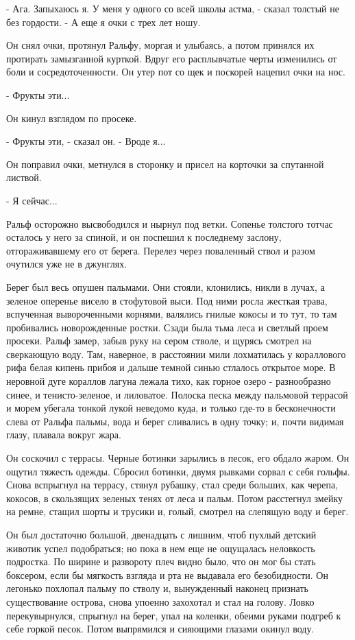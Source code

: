 \documentclass[12pt]{article}
\begin{document}
    - Ага. Запыхаюсь я. У меня у одного  со  всей  школы  астма,  -  сказал
толстый не без гордости. - А еще я очки с трех лет ношу.

    Он  снял  очки, протянул Ральфу, моргая и улыбаясь, а потом принялся их
протирать замызганной курткой. Вдруг его расплывчатые  черты  изменились  от
боли и сосредоточенности. Он утер пот со щек и поскорей нацепил очки на нос.

    - Фрукты эти...

    Он кинул взглядом по просеке.

    - Фрукты эти, - сказал он. - Вроде я...

    Он поправил очки, метнулся в сторонку и присел на корточки за спутанной
листвой.

    - Я сейчас...

    Ральф  осторожно  высвободился  и  нырнул  под  ветки. Сопенье толстого
тотчас осталось у него за  спиной,  и  он  поспешил  к  последнему  заслону,
отгораживавшему  его  от  берега.  Перелез  через  поваленный  ствол и разом
очутился уже не в джунглях.

    Берег был весь опушен пальмами. Они стояли, клонились, никли в лучах, а
зеленое оперенье висело в стофутовой выси. Под  ними  росла  жесткая  трава,
вспученная  вывороченными  корнями,  валялись гнилые кокосы и то тут, то там
пробивались новорожденные ростки. Сзади  была  тьма  леса  и  светлый  проем
просеки.  Ральф  замер,  забыв  руку  на  сером  стволе, и щурясь смотрел на
сверкающую воду. Там, наверное, в расстоянии мили лохматилась у  кораллового
рифа  белая  кипень  прибоя  и дальше темной синью стлалось открытое море. В
неровной дуге кораллов лагуна лежала тихо, как горное озеро  -  разнообразно
синее,  и  тенисто-зеленое,  и  лиловатое.  Полоска  песка  между  пальмовой
террасой и морем убегала тонкой лукой  неведомо  куда,  и  только  где-то  в
бесконечности  слева  от Ральфа пальмы, вода и берег сливались в одну точку;
и, почти видимая глазу, плавала вокруг жара.

    Он соскочил с террасы. Черные ботинки  зарылись  в  песок,  его  обдало
жаром.  Он  ощутил  тяжесть  одежды. Сбросил ботинки, двумя рывками сорвал с
себя гольфы. Снова вспрыгнул на террасу, стянул рубашку, стал среди больших,
как черепа, кокосов, в скользящих зеленых  тенях  от  леса  и  пальм.  Потом
расстегнул  змейку  на  ремне,  стащил  шорты и трусики и, голый, смотрел на
слепящую воду и берег.

    Он был достаточно большой, двенадцать с  лишним,  чтоб  пухлый  детский
животик  успел  подобраться;  но  пока  в  нем  еще  не ощущалась неловкость
подростка. По ширине и развороту плеч  видно  было,  что  он  мог  бы  стать
боксером,  если  бы  мягкость взгляда и рта не выдавала его безобидности. Он
легонько  похлопал  пальму  по  стволу  и,  вынужденный   наконец   признать
существование  острова,  снова  упоенно  захохотал  и  стал на голову. Ловко
перекувырнулся, спрыгнул на берег, упал на коленки, обеими руками подгреб  к
себе горкой песок. Потом выпрямился и сияющими глазами окинул воду.
\end{document}
